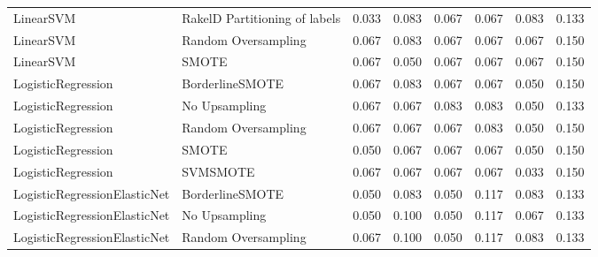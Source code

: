 \begin{tabular}{llllllll}
                      LinearSVM & RakelD Partitioning of labels & 0.033 &                     0.083 &                 0.067 &                  0.067 &                                   0.083 &    0.133 \\
                      LinearSVM &           Random Oversampling & 0.067 &                     0.083 &                 0.067 &                  0.067 &                                   0.067 &    0.150 \\
                      LinearSVM &                         SMOTE & 0.067 &                     0.050 &                 0.067 &                  0.067 &                                   0.067 &    0.150 \\
             LogisticRegression &               BorderlineSMOTE & 0.067 &                     0.083 &                 0.067 &                  0.067 &                                   0.050 &    0.150 \\
             LogisticRegression &                 No Upsampling & 0.067 &                     0.067 &                 0.083 &                  0.083 &                                   0.050 &    0.133 \\
             LogisticRegression &           Random Oversampling & 0.067 &                     0.067 &                 0.067 &                  0.083 &                                   0.050 &    0.150 \\
             LogisticRegression &                         SMOTE & 0.050 &                     0.067 &                 0.067 &                  0.067 &                                   0.050 &    0.150 \\
             LogisticRegression &                      SVMSMOTE & 0.067 &                     0.067 &                 0.067 &                  0.067 &                                   0.033 &    0.150 \\
   LogisticRegressionElasticNet &               BorderlineSMOTE & 0.050 &                     0.083 &                 0.050 &                  0.117 &                                   0.083 &    0.133 \\
   LogisticRegressionElasticNet &                 No Upsampling & 0.050 &                     0.100 &                 0.050 &                  0.117 &                                   0.067 &    0.133 \\
   LogisticRegressionElasticNet &           Random Oversampling & 0.067 &                     0.100 &                 0.050 &                  0.117 &                                   0.083 &    0.133 \\

\end{tabular}
